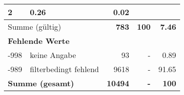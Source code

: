 \begin{longtable}{lXrrr}
       \num{2} &
       \num[round-mode=places,round-precision=2]{0.26} &
         \num[round-mode=places,round-precision=2]{0.02} \\
     \midrule
     \multicolumn{2}{l}{Summe (gültig)} &
       \textbf{\num{783}} &
     \textbf{\num{100}} &
       \textbf{\num[round-mode=places,round-precision=2]{7.46}} \\
     \multicolumn{5}{l}{\textbf{Fehlende Werte}}\\
       -998 &
       keine Angabe &
         \num{93} &
        - &
         \num[round-mode=places,round-precision=2]{0.89} \\
       -989 &
       filterbedingt fehlend &
         \num{9618} &
        - &
         \num[round-mode=places,round-precision=2]{91.65} \\
     \midrule
     \multicolumn{2}{l}{\textbf{Summe (gesamt)}} &
          \textbf{\num{10494}} &
        \textbf{-} &
        \textbf{\num{100}} \\
     \bottomrule
     \end{longtable}
     
